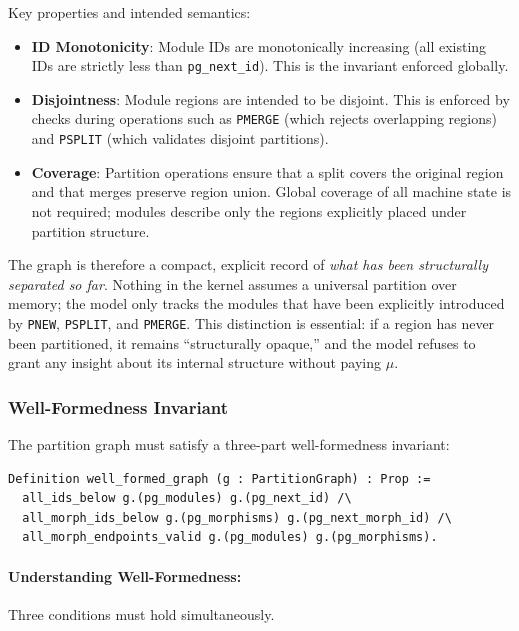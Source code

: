 Key properties and intended semantics:
\begin{itemize}
    \item \textbf{ID Monotonicity}: Module IDs are monotonically increasing (all existing IDs are strictly less than \texttt{pg\_next\_id}). This is the invariant enforced globally.
    \item \textbf{Disjointness}: Module regions are intended to be disjoint. This is enforced by checks during operations such as \texttt{PMERGE} (which rejects overlapping regions) and \texttt{PSPLIT} (which validates disjoint partitions).
    \item \textbf{Coverage}: Partition operations ensure that a split covers the original region and that merges preserve region union. Global coverage of all machine state is not required; modules describe only the regions explicitly placed under partition structure.
\end{itemize}
The graph is therefore a compact, explicit record of \emph{what has been structurally separated so far}. Nothing in the kernel assumes a universal partition over memory; the model only tracks the modules that have been explicitly introduced by \texttt{PNEW}, \texttt{PSPLIT}, and \texttt{PMERGE}. This distinction is essential: if a region has never been partitioned, it remains “structurally opaque,” and the model refuses to grant any insight about its internal structure without paying $\mu$.

\subsubsection{Well-Formedness Invariant}

The partition graph must satisfy a three-part well-formedness invariant:
\begin{lstlisting}
Definition well_formed_graph (g : PartitionGraph) : Prop :=
  all_ids_below g.(pg_modules) g.(pg_next_id) /\
  all_morph_ids_below g.(pg_morphisms) g.(pg_next_morph_id) /\
  all_morph_endpoints_valid g.(pg_modules) g.(pg_morphisms).
\end{lstlisting}

\paragraph{Understanding Well-Formedness:} Three conditions must hold simultaneously.

